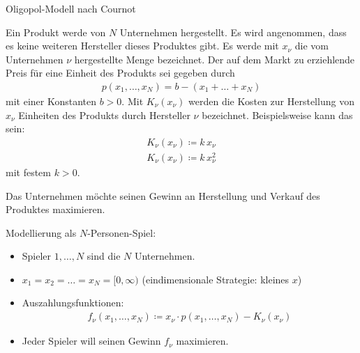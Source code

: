 \begin{beispiel} Oligopol-Modell nach Cournot
  
Ein Produkt werde von $N$ Unternehmen hergestellt. Es wird angenommen, dass es keine weiteren Hersteller dieses Produktes gibt. Es werde mit $x_{\nu}$ die vom Unternehmen $\nu$ hergestellte Menge bezeichnet. Der auf dem Markt zu erziehlende Preis für eine Einheit des Produkts sei gegeben durch
\begin{align*}
  p(x_{1}, \dots, x_{N}) = b-(x_{1} + \dots + x_{N})
\end{align*}
mit einer Konstanten $b > 0$. Mit $K_{\nu}(x_{\nu})$ werden die Kosten zur Herstellung von $x_{\nu}$ Einheiten des Produkts durch Hersteller $\nu$ bezeichnet. Beispielsweise kann das sein:
\begin{align*}
  K_{\nu}(x_{\nu}) \coloneqq k \, x_{\nu} \\
  K_{\nu}(x_{\nu}) \coloneqq k \, x_{\nu}^{2}
\end{align*}
mit festem $k > 0$. 

Das Unternehmen möchte seinen Gewinn an Herstellung und Verkauf des Produktes maximieren. 

Modellierung als $N$-Personen-Spiel: 
\begin{itemize}
\item Spieler $1, \dots, N$ sind die $N$ Unternehmen. 
\item $x_{1} = x_{2} = \dots = x_{N} = [0, \infty)$ (eindimensionale Strategie: kleines $x$)
\item Auszahlungsfunktionen:
  \begin{align*}
    f_{\nu}(x_{1}, \dots, x_{N}) \coloneqq x_{\nu}\cdot p(x_{1}, \dots, x_{N}) - K_{\nu}(x_{\nu})
  \end{align*}
\item Jeder Spieler will seinen Gewinn $f_{\nu}$ maximieren. 
\end{itemize}
\end{beispiel}
